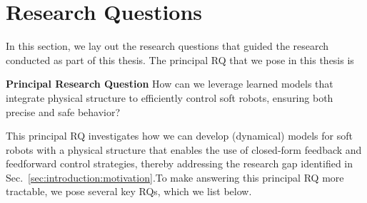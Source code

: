 \section{Research Questions}\label{sec:introduction:research_questions}
In this section, we lay out the research questions that guided the research conducted as part of this thesis.
The principal \gls{RQ} that we pose in this thesis is
\begin{titled-frame}{\textbf{Principal Research Question}}
    \noindent How can we leverage learned models that integrate physical structure to efficiently control soft robots, ensuring both precise and safe behavior?
\end{titled-frame}
This principal \gls{RQ} investigates how we can develop (dynamical) models for soft robots with a physical structure that enables the use of closed-form feedback and feedforward control strategies, thereby addressing the research gap identified in Sec.~\ref{sec:introduction:motivation}.To make answering this principal \gls{RQ} more tractable, we pose several key \glspl{RQ}, which we list below.

